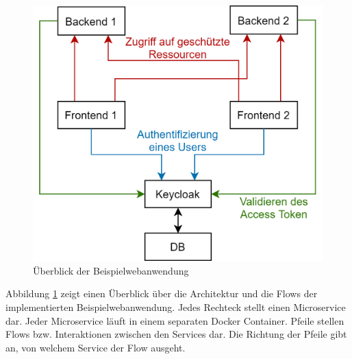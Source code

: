 \begin{figure}[!ht]
	\centering
	\includegraphics[width=.8\textwidth]{Images/EbertScherer/ArchitectureDiagram.png}
	\caption{Überblick der Beispielwebanwendung}
	\label{fig:EB_Beispielwebanwendung Überblick}
\end{figure}

Abbildung \ref{fig:EB_Beispielwebanwendung Überblick} zeigt einen Überblick über die Architektur und die Flows der implementierten Beispielwebanwendung. Jedes Rechteck stellt einen Microservice dar. Jeder Microservice läuft in einem separaten Docker Container. Pfeile stellen Flows bzw. Interaktionen zwischen den Services dar. Die Richtung der Pfeile gibt an, von welchem Service der Flow ausgeht. 

